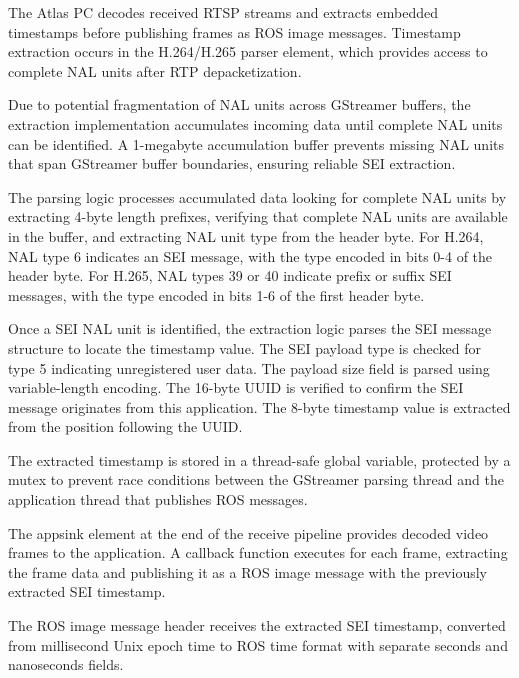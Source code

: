 \documentclass{erauthesis}
\begin{document}
The Atlas PC decodes received RTSP streams and extracts embedded timestamps before publishing frames as ROS image messages.
Timestamp extraction occurs in the H.264/H.265 parser element, which provides access to complete NAL units after RTP depacketization.


Due to potential fragmentation of NAL units across GStreamer buffers, the extraction implementation accumulates incoming data until complete NAL units can be identified.
A 1-megabyte accumulation buffer prevents missing NAL units that span GStreamer buffer boundaries, ensuring reliable SEI extraction.

The parsing logic processes accumulated data looking for complete NAL units by extracting 4-byte length prefixes, verifying that complete NAL units are available in the buffer, and extracting NAL unit type from the header byte.
For H.264, NAL type 6 indicates an SEI message, with the type encoded in bits 0-4 of the header byte.
For H.265, NAL types 39 or 40 indicate prefix or suffix SEI messages, with the type encoded in bits 1-6 of the first header byte.


Once a SEI NAL unit is identified, the extraction logic parses the SEI message structure to locate the timestamp value.
The SEI payload type is checked for type 5 indicating unregistered user data.
The payload size field is parsed using variable-length encoding.
The 16-byte UUID is verified to confirm the SEI message originates from this application.
The 8-byte timestamp value is extracted from the position following the UUID.

The extracted timestamp is stored in a thread-safe global variable, protected by a mutex to prevent race conditions between the GStreamer parsing thread and the application thread that publishes ROS messages.


The appsink element at the end of the receive pipeline provides decoded video frames to the application.
A callback function executes for each frame, extracting the frame data and publishing it as a ROS image message with the previously extracted SEI timestamp.


The ROS image message header receives the extracted SEI timestamp, converted from millisecond Unix epoch time to ROS time format with separate seconds and nanoseconds fields.
\end{document}
